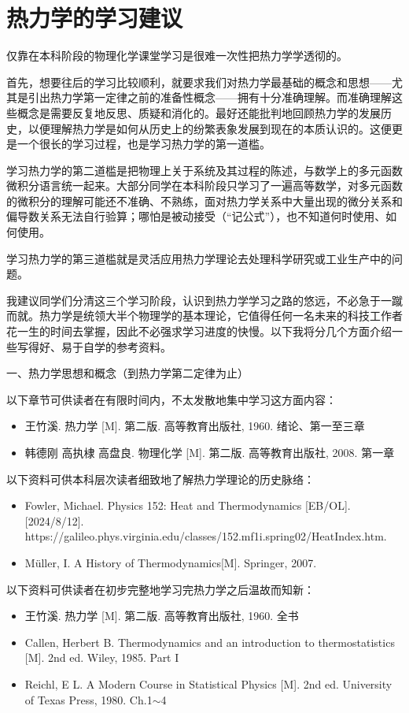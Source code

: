 \documentclass[main.tex]{subfiles}
\begin{document}
\section{热力学的学习建议}\label{I.1 learning_advices}
仅靠在本科阶段的物理化学课堂学习是很难一次性把热力学学透彻的。

首先，想要往后的学习比较顺利，就要求我们对热力学最基础的概念和思想——尤其是引出热力学第一定律之前的准备性概念——拥有十分准确理解。而准确理解这些概念是需要反复地反思、质疑和消化的。最好还能批判地回顾热力学的发展历史，以便理解热力学是如何从历史上的纷繁表象发展到现在的本质认识的。这便更是一个很长的学习过程，也是学习热力学的第一道槛。

学习热力学的第二道槛是把物理上关于系统及其过程的陈述，与数学上的多元函数微积分语言统一起来。大部分同学在本科阶段只学习了一遍高等数学，对多元函数的微积分的理解可能还不准确、不熟练，面对热力学关系中大量出现的微分关系和偏导数关系无法自行验算；哪怕是被动接受（“记公式”），也不知道何时使用、如何使用。

学习热力学的第三道槛就是灵活应用热力学理论去处理科学研究或工业生产中的问题。

我建议同学们分清这三个学习阶段，认识到热力学学习之路的悠远，不必急于一蹴而就。热力学是统领大半个物理学的基本理论，它值得任何一名未来的科技工作者花一生的时间去掌握，因此不必强求学习进度的快慢。以下我将分几个方面介绍一些写得好、易于自学的参考资料。

一、热力学思想和概念（到热力学第二定律为止）

以下章节可供读者在有限时间内，不太发散地集中学习这方面内容：
\begin{itemize}
  \item 王竹溪. 热力学 [M]. 第二版. 高等教育出版社, 1960. 绪论、第一至三章
  \item 韩德刚 高执棣 高盘良. 物理化学 [M]. 第二版. 高等教育出版社, 2008. 第一章
\end{itemize}
以下资料可供本科层次读者细致地了解热力学理论的历史脉络：
\begin{itemize}
  \item Fowler, Michael. Physics 152: Heat and Thermodynamics [EB/OL]. [2024/8/12]. \\https://galileo.phys.virginia.edu/classes/152.mf1i.spring02/HeatIndex.htm.
  \item Müller, I. A History of Thermodynamics[M]. Springer, 2007.
\end{itemize}
以下资料可供读者在初步完整地学习完热力学之后温故而知新：
\begin{itemize}
  \item 王竹溪. 热力学 [M]. 第二版. 高等教育出版社, 1960. 全书
  \item Callen, Herbert B. Thermodynamics and an introduction to thermostatistics [M]. 2nd ed. Wiley, 1985. Part I
  \item Reichl, E L. A Modern Course in Statistical Physics [M]. 2nd ed. University of Texas Press, 1980. Ch.1$\sim$4
\end{itemize}
\end{document}
